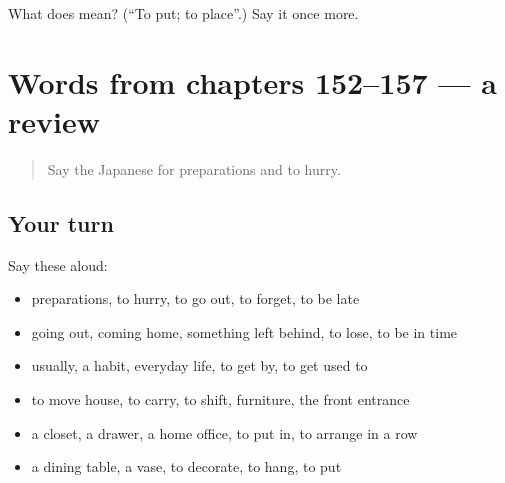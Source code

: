 \begin{tcolorbox}[breakable,colback=teal!4,colframe=teal!35!black,title={Before you move on}]
What does  mean? (\textquotedblleft{}To put; to place\textquotedblright{}.) Say it once more.
\end{tcolorbox}
\section[(dialogue)]{Words from chapters 152–157 — a review}

\label{lesson:JA-R157-review-152-157}



\begin{quote}
Say the Japanese for preparations and to hurry.
\end{quote}

\subsection*{Your turn}
Say these aloud:

\begin{itemize}
\raggedright
  \item preparations, to hurry, to go out, to forget, to be late
  \item going out, coming home, something left behind, to lose, to be in time
  \item usually, a habit, everyday life, to get by, to get used to
  \item to move house, to carry, to shift, furniture, the front entrance
  \item a closet, a drawer, a home office, to put in, to arrange in a row
  \item a dining table, a vase, to decorate, to hang, to put
\end{itemize}

